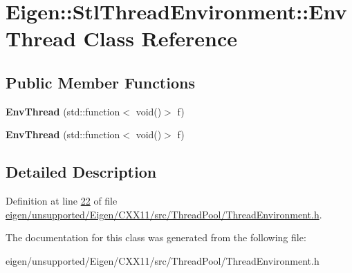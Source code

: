 \hypertarget{class_eigen_1_1_stl_thread_environment_1_1_env_thread}{}\section{Eigen\+:\+:Stl\+Thread\+Environment\+:\+:Env\+Thread Class Reference}
\label{class_eigen_1_1_stl_thread_environment_1_1_env_thread}
\subsection*{Public Member Functions}
\begin{DoxyCompactItemize}
\item 
\mbox{\label{class_eigen_1_1_stl_thread_environment_1_1_env_thread_a954a9281e5502ce24162a3061e6aca3f}} 
{\bfseries Env\+Thread} (std\+::function$<$ void()$>$ f)
\item 
\mbox{\label{class_eigen_1_1_stl_thread_environment_1_1_env_thread_a954a9281e5502ce24162a3061e6aca3f}} 
{\bfseries Env\+Thread} (std\+::function$<$ void()$>$ f)
\end{DoxyCompactItemize}


\subsection{Detailed Description}


Definition at line \hyperlink{eigen_2unsupported_2_eigen_2_c_x_x11_2src_2_thread_pool_2_thread_environment_8h_source_l00022}{22} of file \hyperlink{eigen_2unsupported_2_eigen_2_c_x_x11_2src_2_thread_pool_2_thread_environment_8h_source}{eigen/unsupported/\+Eigen/\+C\+X\+X11/src/\+Thread\+Pool/\+Thread\+Environment.\+h}.



The documentation for this class was generated from the following file\+:\begin{DoxyCompactItemize}
\item 
eigen/unsupported/\+Eigen/\+C\+X\+X11/src/\+Thread\+Pool/\+Thread\+Environment.\+h\end{DoxyCompactItemize}
